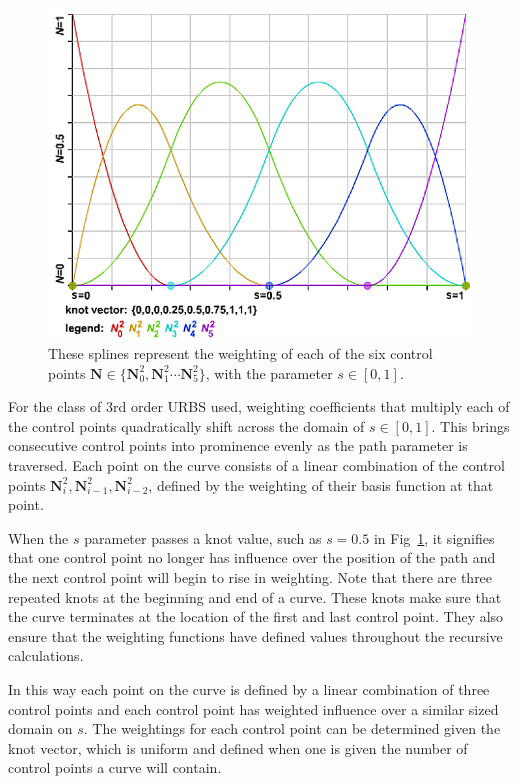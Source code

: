 \begin{figure}  
\includegraphics[width=\textwidth]{figures/optimisation/nurbsBasis.png}
\caption[3rd order (Quadratic) URBS basis splines]{ These splines represent the weighting of each of the six control points $\textbf{N} \in \{\textbf{N}_0^2, \textbf{N}_1^2 \cdots \textbf{N}_5^2\}$, with the parameter $s \in [0, 1].$ \cite{website:nurbsDemo}  
\label{fig:nurbsBasis}}
\end{figure}

For the class of 3rd order URBS used, weighting coefficients that multiply each of the control points quadratically shift across the domain of $s \in [0, 1]$. This brings consecutive control points into prominence evenly as the path parameter is traversed. Each point on the curve consists of a linear combination of the control points $\textbf{N}_i^2, \textbf{N}_{i-1}^2, \textbf{N}_{i-2}^2$, defined by the weighting of their basis function at that point.

When the $s$ parameter passes a knot value, such as $s = 0.5$ in Fig~\ref{fig:nurbsBasis}, it signifies that one control point no longer has influence over the position of the path and the next control point will begin to rise in weighting. Note that there are three repeated knots at the beginning and end of a curve. These knots make sure that the curve terminates at the location of the first and last control point. They also ensure that the weighting functions have defined values throughout the recursive calculations.

In this way each point on the curve is defined by a linear combination of three control points and each control point has weighted influence over a similar sized domain on $s$. The weightings for each control point can be determined given the knot vector, which is uniform and defined when one is given the number of control points a curve will contain.


